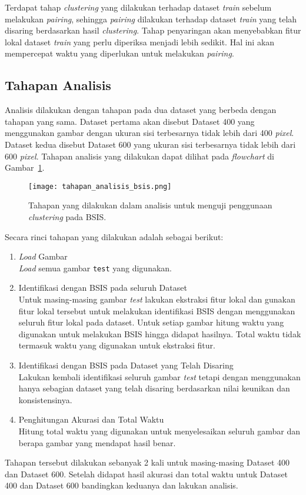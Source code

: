 Terdapat tahap \textit{clustering} yang dilakukan terhadap dataset \textit{train} sebelum melakukan \textit{pairing}, sehingga \textit{pairing} dilakukan terhadap dataset \textit{train} yang telah disaring berdasarkan hasil \textit{clustering}. Tahap penyaringan akan menyebabkan fitur lokal dataset \textit{train} yang perlu diperiksa menjadi lebih sedikit. Hal ini akan mempercepat waktu yang diperlukan untuk melakukan \textit{pairing}.


\subsection{Tahapan Analisis}
Analisis dilakukan dengan tahapan pada dua dataset yang berbeda dengan tahapan yang sama. Dataset pertama akan disebut Dataset 400 yang menggunakan gambar dengan ukuran sisi terbesarnya tidak lebih dari 400 \textit{pixel}. Dataset kedua disebut Dataset 600 yang ukuran sisi terbesarnya tidak lebih dari 600 \textit{pixel}. Tahapan analisis yang dilakukan dapat dilihat pada \textit{flowchart} di Gambar~\ref{fig:tahapan_analisis_bsis}.
\begin{figure}
	\centering
	\texttt{[image: tahapan\_analisis\_bsis.png]}
	\caption{Tahapan yang dilakukan dalam analisis untuk menguji penggunaan \textit{clustering} pada BSIS.}
	\label{fig:tahapan_analisis_bsis}
\end{figure}
Secara rinci tahapan yang dilakukan adalah sebagai berikut:
\begin{enumerate}
	\item \textit{Load} Gambar \\
	\textit{Load} semua gambar \texttt{test} yang digunakan.
	\item Identifikasi dengan BSIS pada seluruh Dataset \\
	Untuk masing-masing gambar \textit{test} lakukan ekstraksi fitur lokal dan gunakan fitur lokal tersebut untuk melakukan identifikasi BSIS dengan menggunakan seluruh fitur lokal pada dataset. Untuk setiap gambar hitung waktu yang digunakan untuk melakukan BSIS hingga didapat hasilnya. Total waktu tidak termasuk waktu yang digunakan untuk ekstraksi fitur.
	\item Identifikasi dengan BSIS pada Dataset yang Telah Disaring \\
	Lakukan kembali identifikasi seluruh gambar \textit{test} tetapi dengan menggunakan hanya sebagian dataset yang telah disaring berdasarkan nilai keunikan dan konsistensinya.
	\item Penghitungan Akurasi dan Total Waktu \\
	Hitung total waktu yang digunakan untuk menyelesaikan seluruh gambar dan berapa gambar yang mendapat hasil benar.
\end{enumerate}
Tahapan tersebut dilakukan sebanyak 2 kali untuk masing-masing Dataset 400 dan Dataset 600. Setelah didapat hasil akurasi dan total waktu untuk Dataset 400 dan Dataset 600 bandingkan keduanya dan lakukan analisis.


